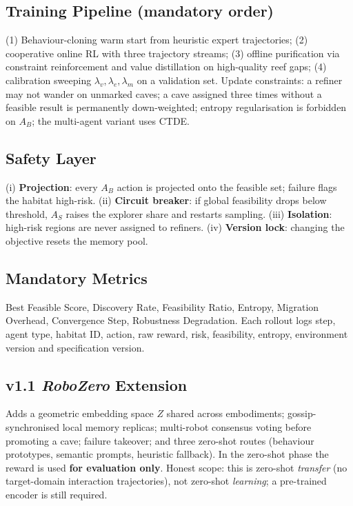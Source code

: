 \documentclass[11pt,a4paper]{article}
\begin{document}
\subsection{Training Pipeline (mandatory order)}
(1) Behaviour-cloning warm start from heuristic expert trajectories; (2) cooperative online RL with three trajectory streams; (3) offline purification via constraint reinforcement and value distillation on high-quality reef gaps; (4) calibration sweeping $\lambda_v,\lambda_e,\lambda_m$ on a validation set. Update constraints: a refiner may not wander on unmarked caves; a cave assigned three times without a feasible result is permanently down-weighted; entropy regularisation is forbidden on $A_B$; the multi-agent variant uses CTDE.

\subsection{Safety Layer}
(i) \textbf{Projection}: every $A_B$ action is projected onto the feasible set; failure flags the habitat high-risk. (ii) \textbf{Circuit breaker}: if global feasibility drops below threshold, $A_S$ raises the explorer share and restarts sampling. (iii) \textbf{Isolation}: high-risk regions are never assigned to refiners. (iv) \textbf{Version lock}: changing the objective resets the memory pool.

\subsection{Mandatory Metrics}
Best Feasible Score, Discovery Rate, Feasibility Ratio, Entropy, Migration Overhead, Convergence Step, Robustness Degradation. Each rollout logs step, agent type, habitat ID, action, raw reward, risk, feasibility, entropy, environment version and specification version.

\subsection{v1.1 \emph{RoboZero} Extension}
Adds a geometric embedding space $Z$ shared across embodiments; gossip-synchronised local memory replicas; multi-robot consensus voting before promoting a cave; failure takeover; and three zero-shot routes (behaviour prototypes, semantic prompts, heuristic fallback). In the zero-shot phase the reward is used \textbf{for evaluation only}. Honest scope: this is zero-shot \emph{transfer} (no target-domain interaction trajectories), not zero-shot \emph{learning}; a pre-trained encoder is still required.
\end{document}
